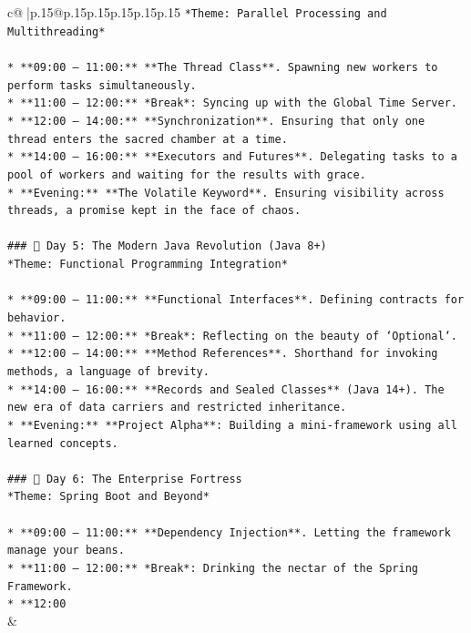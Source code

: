 \documentclass{article}
\begin{document}
{\begin{supertabular}{c@{$\;$}|p{.15\linewidth}@{}p{.15\linewidth}p{.15\linewidth}p{.15\linewidth}p{.15\linewidth}p{.15\linewidth}}
{{{\texttt{*Theme: Parallel Processing and Multithreading*} \\
\\ 
\texttt{*   **09:00 – 11:00:** **The Thread Class**. Spawning new workers to perform tasks simultaneously.} \\
\texttt{*   **11:00 – 12:00:** *Break*: Syncing up with the Global Time Server.} \\
\texttt{*   **12:00 – 14:00:** **Synchronization**. Ensuring that only one thread enters the sacred chamber at a time.} \\
\texttt{*   **14:00 – 16:00:** **Executors and Futures**. Delegating tasks to a pool of workers and waiting for the results with grace.} \\
\texttt{*   **Evening:** **The Volatile Keyword**. Ensuring visibility across threads, a promise kept in the face of chaos.} \\
\\ 
\texttt{\#\#\# 📅 Day 5: The Modern Java Revolution (Java 8+)} \\
\texttt{*Theme: Functional Programming Integration*} \\
\\ 
\texttt{*   **09:00 – 11:00:** **Functional Interfaces**. Defining contracts for behavior.} \\
\texttt{*   **11:00 – 12:00:** *Break*: Reflecting on the beauty of `Optional`.} \\
\texttt{*   **12:00 – 14:00:** **Method References**. Shorthand for invoking methods, a language of brevity.} \\
\texttt{*   **14:00 – 16:00:** **Records and Sealed Classes** (Java 14+). The new era of data carriers and restricted inheritance.} \\
\texttt{*   **Evening:** **Project Alpha**: Building a mini{-}framework using all learned concepts.} \\
\\ 
\texttt{\#\#\# 📅 Day 6: The Enterprise Fortress} \\
\texttt{*Theme: Spring Boot and Beyond*} \\
\\ 
\texttt{*   **09:00 – 11:00:** **Dependency Injection**. Letting the framework manage your beans.} \\
\texttt{*   **11:00 – 12:00:** *Break*: Drinking the nectar of the Spring Framework.} \\
\texttt{*   **12:00} \\
            }
        }
    }
    & \\ \\


\end{supertabular}}
\end{document}
